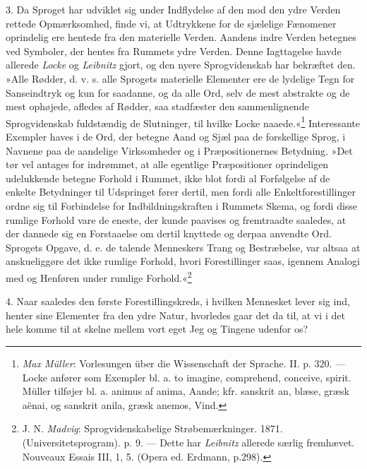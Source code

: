 \documentclass[12pt,a4paper,openany]{book}
\newcommand{\opage}[1]{\marginnote{\footnotesize\textit{[#1]}}}
\begin{document}
3. Da Sproget har udviklet sig under Indflydelse af den mod den ydre
Verden rettede Opmærksomhed, finde vi, at Udtrykkene for de sjælelige
Fænomener oprindelig ere hentede fra den materielle Verden. Aandens
indre Verden betegnes ved Symboler, der hentes fra Rummets ydre Verden.
Denne Iagttagelse havde allerede \emph{Locke} og \emph{Leibnitz} gjort,
og den nyere Sprogvidenskab har bekræftet den. »Alle Rødder, d. v. s.
alle Sprogets materielle Elementer ere de lydelige Tegn for Sanseindtryk
og kun for saadanne, og da alle Ord, selv de mest abstrakte og de mest
ophøjede, afledes af Rødder, saa stadfæster den sammenlignende
Sprogvidenskab fuldstændig de Slutninger, til hvilke Locke
naaede.«\footnote[1]{\emph{Max Müller}: Vorlesungen über die
Wissenschaft der Sprache. II. p. 320. --- Locke anfører som Exempler bl.
a. to imagine, comprehend, conceive, spirit. Müller tilføjer bl. a.
animus af anima, Aande; kfr. sanskrit an, blæse, græsk aënai, og
sanskrit anila, græsk anemos, Vind.} Interessante Exempler haves i de
Ord, der betegne Aand og Sjæl paa de forskellige
\opage{3}Sprog, i Navnene paa de aandelige Virksomheder og i
Præpositionernes Betydning. »Det tør vel antages for indrømmet, at alle
egentlige Præpositioner oprindeligen udelukkende betegne Forhold i
Rummet, ikke blot fordi al Forfølgelse af de enkelte Betydninger til
Udspringet fører dertil, men fordi alle Enkeltforestillinger ordne sig
til Forbindelse for Indbildningskraften i Rummets Skema, og fordi disse
rumlige Forhold vare de eneste, der kunde paavises og fremtraadte
saaledes, at der dannede sig en Forstaaelse om dertil knyttede og derpaa
anvendte Ord. Sprogets Opgave, d. e. de talende Menneskers Trang og
Bestræbelse, var altsaa at anskueliggøre det ikke rumlige Forhold, hvori
Forestillinger saas, igennem Analogi med og Henføren under rumlige
Forhold.«\footnote[1]{J. N. \emph{Madvig}: Sprogvidenskabelige
Strøbemærkninger. 1871. (Universitetsprogram). p. 9. --- Dette har
\emph{Leibnitz} allerede særlig fremhævet. Nouveaux Essais III, 1, 5.
(Opera ed. Erdmann, p.298).}

4. Naar saaledes den første Forestillingskreds, i hvilken Mennesket
lever sig ind, henter sine Elementer fra den ydre Natur, hvorledes gaar
det da til, at vi i det hele komme til at skelne mellem vort eget Jeg og
Tingene udenfor os?
\end{document}
